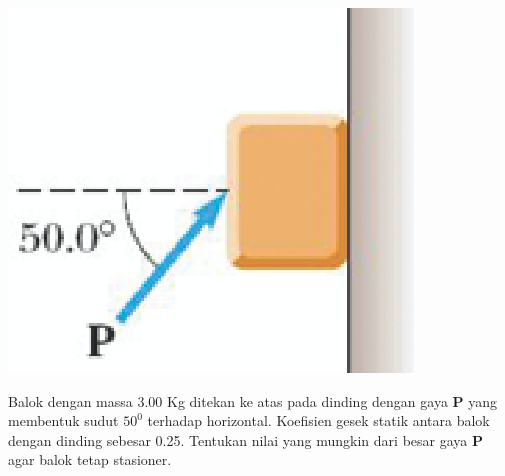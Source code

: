 \item
\mbox{}
\begin{center}
\includegraphics [scale=0.6]{./latex/eps/1_5_14_image_1.eps}
\end{center}

Balok dengan massa 3.00 Kg ditekan ke atas pada dinding dengan gaya \textbf{P} yang membentuk sudut $50^{0}$ terhadap horizontal. Koefisien gesek statik antara balok dengan dinding sebesar 0.25. Tentukan nilai yang mungkin dari besar gaya \textbf{P} agar balok tetap stasioner.

